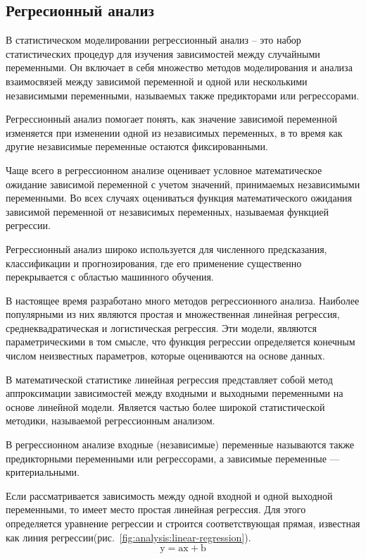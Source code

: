 \subsection{Регресионный анализ}
\label{sec:analysis:regression}

В статистическом моделировании регрессионный анализ -- это набор статистических процедур для изучения зависимостей между
случайными переменными. Он включает в себя множество методов моделирования и анализа взаимосвязей между зависимой
переменной и одной или несколькими независимыми переменными, называемых также предикторами или регрессорами.

Регрессионный анализ помогает понять, как значение зависимой переменной изменяется при изменении одной из независимых
переменных, в то время как другие независимые переменные остаются фиксированными.

Чаще всего в регрессионном анализе оценивает условное математическое ожидание зависимой переменной с учетом значений,
принимаемых независимыми переменными. Во всех случаях оцениваться функция математического ожидания зависимой переменной
от независимых переменных, называемая функцией регрессии.

Регрессионный анализ широко используется для численного предсказания, классификации и прогнозирования, где его
применение существенно перекрывается с областью машинного обучения.

В настоящее время разработано много методов регрессионного анализа. Наиболее популярными из них являются простая и
множественная линейная регрессия, среднеквадратическая и логистическая регрессия. Эти модели, являются параметрическими
в том смысле, что функция регрессии определяется конечным числом неизвестных параметров, которые оцениваются на основе данных.

В математической статистике линейная регрессия представляет собой метод аппроксимации зависимостей между входными и
выходными переменными на основе линейной модели. Является частью более широкой статистической методики, называемой
регрессионным анализом.

В регрессионном анализе входные (независимые) переменные называются также предикторными переменными или регрессорами,
а зависимые переменные — критериальными.

Если рассматривается зависимость между одной входной и одной выходной переменными, то имеет место простая линейная
регрессия. Для этого определяется уравнение регрессии 
и строится соответствующая прямая, известная как линия регрессии(рис.~\ref{fig:analysis:linear-regression}).
\begin{equation}
	\text{y} = \text{ax} + \text{b}
\end{equation}

